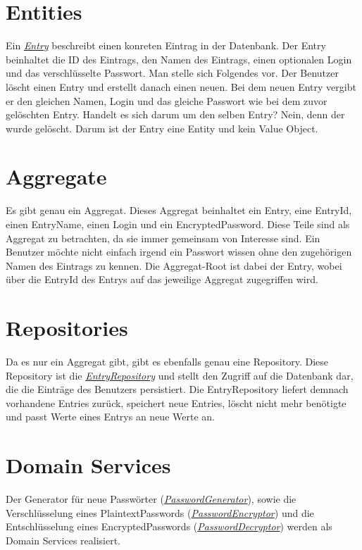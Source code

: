 \section{Entities}
Ein \href{https://github.com/moorts/Morik/blob/main/src/application/DDD/Entry.h}{\textit{Entry}} beschreibt einen konreten Eintrag in der Datenbank. Der Entry beinhaltet die ID des Eintrags, den Namen des Eintrags, einen optionalen Login und das verschlüsselte Passwort. Man stelle sich Folgendes vor. Der Benutzer löscht einen Entry und erstellt danach einen neuen. Bei dem neuen Entry vergibt er den gleichen Namen, Login und das gleiche Passwort wie bei dem zuvor gelöschten Entry. Handelt es sich darum um den selben Entry? Nein, denn der wurde gelöscht. Darum ist der Entry eine Entity und kein Value Object.

\section{Aggregate}
Es gibt genau ein Aggregat. Dieses Aggregat beinhaltet ein Entry, eine EntryId, einen EntryName, einen Login und ein EncryptedPassword. Diese Teile sind als Aggregat zu betrachten, da sie immer gemeinsam von Interesse sind. Ein Benutzer möchte nicht einfach irgend ein Passwort wissen ohne den zugehörigen Namen des Eintrags zu kennen. Die Aggregat-Root ist dabei der Entry, wobei über die EntryId des Entrys auf das jeweilige Aggregat zugegriffen wird.

\section{Repositories}
Da es nur ein Aggregat gibt, gibt es ebenfalls genau eine Repository. Diese Repository ist die \href{https://github.com/moorts/Morik/blob/main/src/application/DDD/EntryRepository.h}{\textit{EntryRepository}} und stellt den Zugriff auf die Datenbank dar, die die Einträge des Benutzers persistiert. Die EntryRepository liefert demnach vorhandene Entries zurück, speichert neue Entries, löscht nicht mehr benötigte und passt Werte eines Entrys an neue Werte an.

\section{Domain Services}
Der Generator für neue Passwörter (\href{https://github.com/moorts/Morik/blob/main/src/application/DDD/PasswordGenerator.h}{\textit{PasswordGenerator}}), sowie die Verschlüsselung eines PlaintextPasswords (\href{https://github.com/moorts/Morik/blob/main/src/application/DDD/PasswordEncryption.h#L11}{\textit{PasswordEncryptor}}) und die Entschlüsselung eines EncryptedPasswords (\href{https://github.com/moorts/Morik/blob/main/src/application/DDD/PasswordEncryption.h#L22}{\textit{PasswordDecryptor}}) werden als Domain Services realisiert.
